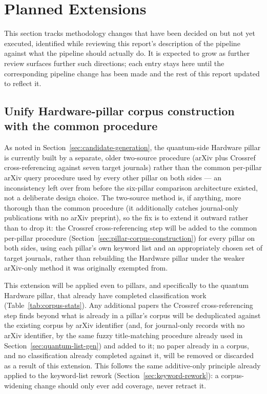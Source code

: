 \section{Planned Extensions}
\label{sec:planned-extensions}

This section tracks methodology changes that have been decided on but not yet
executed, identified while reviewing this report's description of the pipeline against
what the pipeline should actually do. It is expected to grow as further review surfaces
further such directions; each entry stays here until the corresponding pipeline change
has been made and the rest of this report updated to reflect it.

\subsection{Unify Hardware-pillar corpus construction with the common procedure}
\label{sec:planned-hardware-unification}

As noted in Section~\ref{sec:candidate-generation}, the quantum-side Hardware pillar is
currently built by a separate, older two-source procedure (arXiv plus Crossref
cross-referencing against seven target journals) rather than the common per-pillar
arXiv query procedure used by every other pillar on both sides --- an inconsistency
left over from before the six-pillar comparison architecture existed, not a deliberate
design choice. The two-source method is, if anything, more thorough than the common
procedure (it additionally catches journal-only publications with no arXiv preprint),
so the fix is to extend it outward rather than to drop it: the Crossref
cross-referencing step will be added to the common per-pillar procedure
(Section~\ref{sec:pillar-corpus-construction}) for every pillar on both sides, using
each pillar's own keyword list and an appropriately chosen set of target journals,
rather than rebuilding the Hardware pillar under the weaker arXiv-only method it was
originally exempted from.

This extension will be applied even to pillars, and specifically to the quantum
Hardware pillar, that already have completed classification work
(Table~\ref{tab:corpus-stats}). Any additional papers the Crossref cross-referencing
step finds beyond what is already in a pillar's corpus will be deduplicated against the
existing corpus by arXiv identifier (and, for journal-only records with no arXiv
identifier, by the same fuzzy title-matching procedure already used in
Section~\ref{sec:quantum-list-gen}) and added to it; no paper already in a corpus, and
no classification already completed against it, will be removed or discarded as a
result of this extension. This follows the same additive-only principle already
applied to the keyword-list rework (Section~\ref{sec:keyword-rework}): a corpus-widening
change should only ever add coverage, never retract it.

